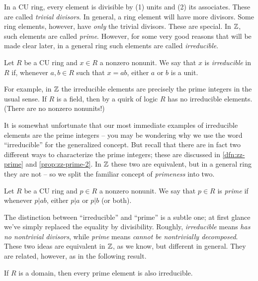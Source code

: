 In a CU ring, every element is divisible by (1) units and (2) its associates.
These are called \emph{trivial divisors}.
In general, a ring element will have more divisors.
Some ring elements, however, have \emph{only} the trivial divisors.
These are special.
In \(\mathbb{Z}\), such elements are called \emph{prime}.
However, for some very good reasons that will be made clear later, in a general ring such elements are called \emph{irreducible}.

\begin{dfn}[Irreducible] \label{dfn:irreducible-element}
Let \(R\) be a CU ring and \(x \in R\) a nonzero nonunit.
We say that \(x\) is \emph{irreducible} in \(R\) if, whenever \(a,b \in R\) such that \(x = ab\), either \(a\) or \(b\) is a unit.
\end{dfn}

For example, in \(\mathbb{Z}\) the irreducible elements are precisely the prime integers in the usual sense.
If \(R\) is a field, then by a quirk of logic \(R\) has no irreducible elements.
(There are no nonzero nonunits!)

It is somewhat unfortunate that our most immediate examples of irreducible elements are the prime integers -- you may be wondering why we use the word ``irreducible'' for the generalized concept.
But recall that there are in fact two different ways to characterize the prime integers; these are discussed in \ref{dfn:zz-prime} and \ref{prop:zz-prime-2}.
In \(\mathbb{Z}\) these two are equivalent, but in a general ring they are not -- so we split the familiar concept of \emph{primeness} into two.

\begin{dfn}[Prime] \label{dfn:prime-element}
Let \(R\) be a CU ring and \(p \in R\) a nonzero nonunit.
We say that \(p \in R\) is \emph{prime} if whenever \(p|ab\), either \(p|a\) or \(p|b\) (or both).
\end{dfn}

The distinction between ``irreducible'' and ``prime'' is a subtle one; at first glance we've simply replaced the equality by divisibility.
Roughly, \emph{irreducible} means \emph{has no nontrivial divisors}, while \emph{prime} means \emph{cannot be nontrivially decomposed}.
These two ideas are equivalent in \(\mathbb{Z}\), as we know, but different in general.
They are related, however, as in the following result.

\begin{prop}
If \(R\) is a domain, then every prime element is also irreducible.
\end{prop}


